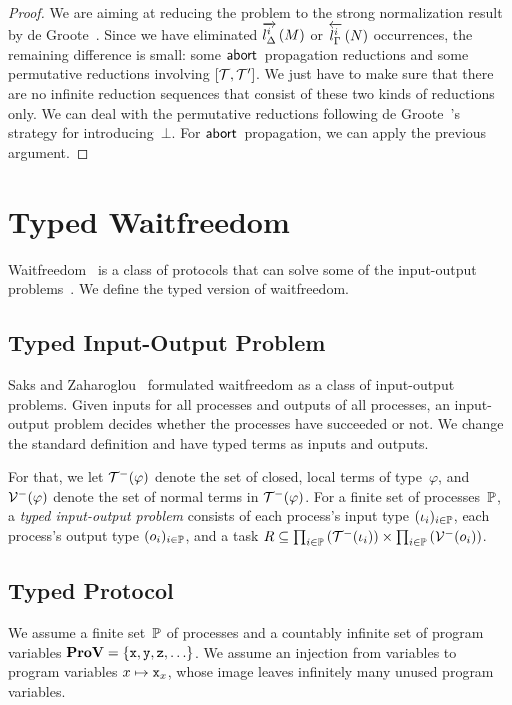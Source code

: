 \begin{proof}
We are aiming at reducing the problem to the strong normalization result
by de Groote~\cite{Philippe2002js}.
Since we have eliminated $\ltor i l \Delta M$ or $\rtol i l\Gamma N$ occurrences,
the remaining difference is small: some $\abort$ propagation reductions
 and some permutative reductions involving $\cotuple{\term,\term'}$.
We just have to make sure that there are no infinite reduction sequences
that consist of these two kinds of reductions only.
We can deal with the permutative reductions following de
 Groote~\cite{Philippe2002js}'s strategy for introducing~$\bot$.
For $\abort$ propagation, we can apply the previous argument.
\end{proof}

\section{Typed Waitfreedom}
\label{waitfreedom}

Waitfreedom~\cite{Herlihy88,Saks:1993vq} is a class of protocols
that can solve
some of the input-output problems~\cite{Moran:1987ep,Biran:1988hh}.
We define the typed version of waitfreedom.

\subsection{Typed Input-Output Problem}

Saks and Zaharoglou~\cite{Saks:1993vq} formulated waitfreedom as a class
of input-output
problems.
Given inputs for all processes and outputs of all
processes, an input-output problem decides whether the processes have
succeeded or not.
We change the standard definition and have typed terms as inputs and
outputs.

For that, we let $\lterm(\varphi)$ denote the set of closed, local terms of
type~$\varphi$,
and $\lval(\varphi)$ denote the set of normal terms in $\lterm(\varphi)$.
For a finite set of processes~$\processes$, 
a \textit{typed input-output problem} consists of each process's input type
$(\iota_i)_{i\in \processes}$, each process's output type $(o_i)_{i\in
\processes}$, and a
task $R\subseteq \prod_{i\in \processes}\left(\lterm(\iota_i)\right)\times
 \prod_{i\in \processes}\left(\lval(o_i)\right)$.

\subsection{Typed Protocol}

We assume a finite set~$\processes$
of processes and a countably infinite
set of program variables $\ProV =\{\p x, \p y, \p z, \ldots\}$.
We assume an injection from variables to program variables $x\mapsto
\p{x}_x$, whose image leaves infinitely many unused program variables.

